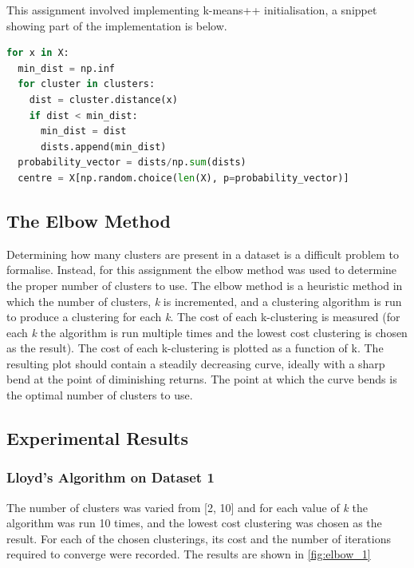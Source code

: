 \documentclass[12pt]{article}
\begin{document}
This assignment involved implementing k-means++ initialisation, a snippet
showing part of the implementation is below.

\begin{lstlisting}[language=Python]
for x in X:
  min_dist = np.inf
  for cluster in clusters:
    dist = cluster.distance(x)
    if dist < min_dist:
      min_dist = dist
      dists.append(min_dist)
  probability_vector = dists/np.sum(dists)
  centre = X[np.random.choice(len(X), p=probability_vector)]
\end{lstlisting}

\subsection{The Elbow Method}

Determining how many clusters are present in a dataset is a difficult problem
to formalise. Instead, for this assignment the elbow method was used to determine
the proper number of clusters to use. The elbow method is a heuristic method
in which the number of clusters, \emph{k} is incremented, and a clustering algorithm is
run to produce a clustering for each \emph{k}. The cost of each k-clustering
is measured (for each \emph{k} the algorithm is run multiple times and the lowest
cost clustering is chosen as the result). The cost of each k-clustering is
plotted as a function of k. The resulting plot should contain a steadily decreasing
curve, ideally with a sharp bend at the point of diminishing returns. The point
at which the curve bends is the optimal number of clusters to use.

\subsection{Experimental Results}

\subsubsection{Lloyd's Algorithm on Dataset 1}

The number of clusters was varied from [2, 10] and for each value of \emph{k} the
algorithm was run 10 times, and the lowest cost clustering was chosen as the
result. For each of the chosen clusterings, its cost and the number of iterations
required to converge were recorded. The results are shown in \ref{fig:elbow_1}
\end{document}
